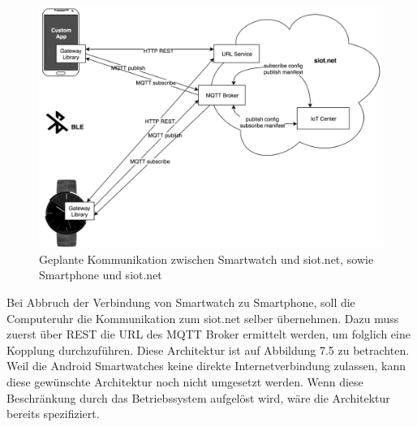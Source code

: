 \begin{figure}[h]
  \centering
  \includegraphics[scale=0.15]{98_Bilder/07_Architektur/02_Architektur}
  \caption[Geplante Netzwerk-Architektur ohne BLE/mit WLAN]{Geplante Kommunikation zwischen Smartwatch und siot.net, sowie Smartphone und siot.net}
\end{figure}
Bei Abbruch der Verbindung von Smartwatch zu Smartphone, soll die Computeruhr die Kommunikation zum siot.net selber übernehmen. Dazu muss zuerst über \gls{REST} die URL des \gls{MQTT} Broker ermittelt werden, um folglich eine Kopplung durchzuführen. Diese Architektur ist auf Abbildung 7.5 zu betrachten. Weil die Android Smartwatches keine direkte Internetverbindung zulassen, kann diese gewünschte Architektur noch nicht umgesetzt werden. Wenn diese Beschränkung durch das Betriebssystem aufgelöst wird, wäre die Architektur bereits spezifiziert.

\newpage
